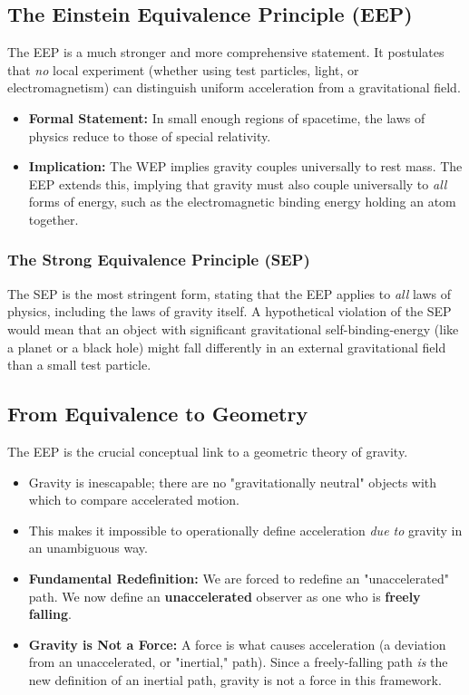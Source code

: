 \documentclass[11pt, a4paper]{report}
\begin{document}




\subsection*{The Einstein Equivalence Principle (EEP)}
The EEP is a much stronger and more comprehensive statement. It postulates that \emph{no} local experiment (whether using test particles, light, or electromagnetism) can distinguish uniform acceleration from a gravitational field.

\begin{itemize}
    \item \textbf{Formal Statement:} In small enough regions of spacetime, the laws of physics reduce to those of special relativity.
    \item \textbf{Implication:} The WEP implies gravity couples universally to rest mass. The EEP extends this, implying that gravity must also couple universally to \emph{all} forms of energy, such as the electromagnetic binding energy holding an atom together.
\end{itemize}

\subsubsection*{The Strong Equivalence Principle (SEP)}
The SEP is the most stringent form, stating that the EEP applies to \emph{all} laws of physics, including the laws of gravity itself. A hypothetical violation of the SEP would mean that an object with significant gravitational self-binding-energy (like a planet or a black hole) might fall differently in an external gravitational field than a small test particle.

\subsection*{From Equivalence to Geometry}
The EEP is the crucial conceptual link to a geometric theory of gravity.
\begin{itemize}
    \item Gravity is inescapable; there are no "gravitationally neutral" objects with which to compare accelerated motion.
    \item This makes it impossible to operationally define acceleration \emph{due to} gravity in an unambiguous way.
    \item \textbf{Fundamental Redefinition:} We are forced to redefine an "unaccelerated" path. We now define an \textbf{unaccelerated} observer as one who is \textbf{freely falling}.
    \item \textbf{Gravity is Not a Force:} A force is what causes acceleration (a deviation from an unaccelerated, or "inertial," path). Since a freely-falling path \emph{is} the new definition of an inertial path, gravity is not a force in this framework.
\end{itemize}
\end{document}
